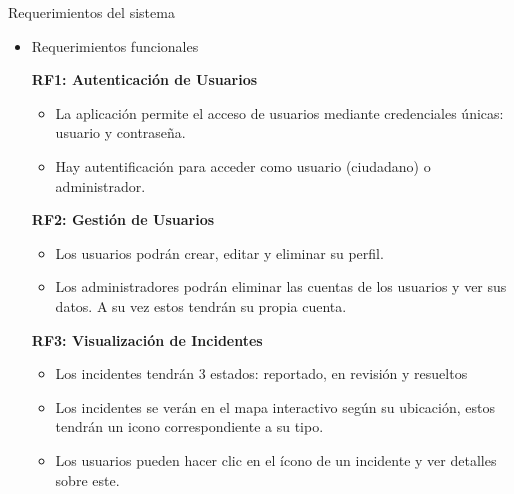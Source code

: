 {\Large \color{Naranja}Requerimientos del sistema}

\begin{itemize}[label=\textcolor{Lotus}{$\triangleright$}]
    \item {
        {\large \color{Purpura}Requerimientos funcionales}



        \textbf{RF1: Autenticación de Usuarios}
        \begin{itemize}[label=\textcolor{Amarillo}{$\triangleright$}]
        \item La aplicación permite el acceso de usuarios mediante credenciales únicas: usuario y contraseña.
        \item Hay autentificación para acceder como usuario (ciudadano) o administrador. 
        \end{itemize} 
        \textbf{RF2: Gestión de Usuarios}
        \begin{itemize}[label=\textcolor{Amarillo}{$\triangleright$}]
        \item Los usuarios podrán crear, editar y eliminar su perfil. 
        \item Los administradores podrán eliminar las cuentas de los usuarios y ver sus datos. A su vez estos tendrán su propia cuenta. 
        \end{itemize}
        \textbf{RF3: Visualización de Incidentes}
        \begin{itemize}[label=\textcolor{Amarillo}{$\triangleright$}] %
        \item Los incidentes tendrán 3 estados: reportado, en revisión y resueltos 
        \item Los incidentes se verán en el mapa interactivo según su ubicación, estos tendrán un icono correspondiente a su tipo. 
        \item Los usuarios pueden hacer clic en el ícono de un incidente y ver detalles sobre este.
        \end{itemize}
        
}
\end{itemize}
